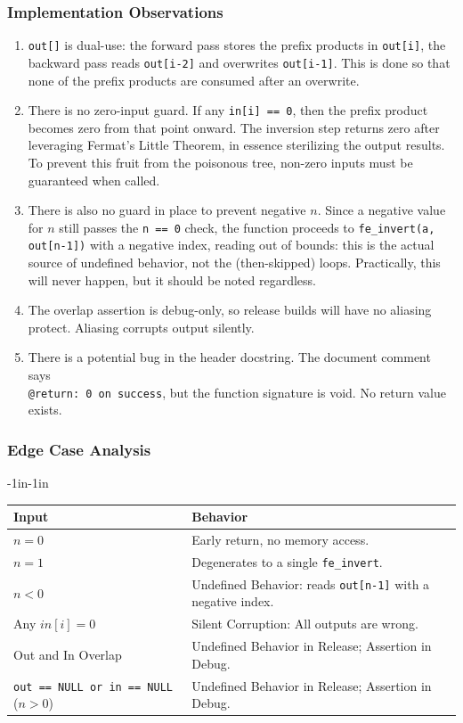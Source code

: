 \documentclass[12pt,titlepage,table]{article}
\begin{document}
\subsubsection{Implementation Observations}
\begin{enumerate}
\item \verb|out[]| is dual-use: the forward pass stores the prefix products in \verb|out[i]|, the backward pass reads \verb|out[i-2]| and overwrites \verb|out[i-1]|. This is done so that none of the prefix products are consumed after an overwrite.
\item There is no zero-input guard. If any \verb|in[i] == 0|, then the prefix product becomes zero from that point onward. The inversion step returns zero after leveraging Fermat's Little Theorem, in essence sterilizing the output results. To prevent this fruit from the poisonous tree, non-zero inputs must be guaranteed when called.
\item There is also no guard in place to prevent negative $n$.  Since a negative value for $n$ still passes the \verb|n == 0| check, the function proceeds to \verb|fe_invert(a, out[n-1])| with a negative index, reading out of bounds: this is the actual source of undefined behavior, not the (then-skipped) loops.  Practically, this will never happen, but it should be noted regardless.
\item The overlap assertion is debug-only, so release builds will have no aliasing protect. Aliasing corrupts output silently. \\
\item There is a potential bug in the header docstring. The document comment says \\
 \verb|@return: 0 on success|, but the function signature is void. No return value exists.
\end{enumerate}

\subsubsection{Edge Case Analysis}
\begin{table}[htbp]
\begin{adjustwidth}{-1in}{-1in}
\centering
{
\begin{tabular}{| l | l |}
\hline
\textbf{Input} & \textbf{Behavior} \\
\hline
\hline
$n = 0$ & Early return, no memory access. \\
$n = 1$ & Degenerates to a single \verb|fe_invert|. \\
$n < 0$ & Undefined Behavior: reads \verb|out[n-1]| with a negative index.\\
Any $in[i] = 0$ & Silent Corruption: All outputs are wrong. \\
Out and In Overlap & Undefined Behavior in Release; Assertion in Debug. \\
\verb|out == NULL or in == NULL| ($n > 0$) & Undefined Behavior in Release; Assertion in Debug. \\
\hline
\end{tabular}}
\end{adjustwidth}
\end{table}
\end{document}
